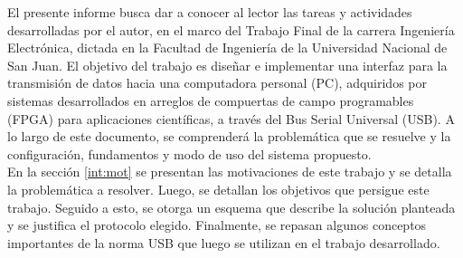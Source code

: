 El presente informe busca dar a conocer al lector las tareas y actividades desarrolladas por el autor, en el marco del Trabajo Final de la carrera Ingeniería Electrónica, dictada en la Facultad de Ingeniería de la Universidad Nacional de San Juan. El objetivo del trabajo es diseñar e implementar una interfaz para la transmisión de datos hacia una computadora personal (PC), adquiridos por sistemas desarrollados en arreglos de compuertas de campo programables (FPGA) para aplicaciones científicas, a través del Bus Serial Universal (USB). A lo largo de este documento, se comprenderá la problemática que se resuelve y la configuración, fundamentos y modo de uso del sistema propuesto. \\


En la sección \ref{int:mot} se presentan las motivaciones de este trabajo y se detalla la problemática a resolver. Luego, se detallan los objetivos que persigue este trabajo. Seguido a esto, se otorga un esquema que describe la solución planteada y se justifica el protocolo elegido. Finalmente, se repasan algunos conceptos importantes de la norma USB que luego se utilizan en el trabajo desarrollado.\\ 